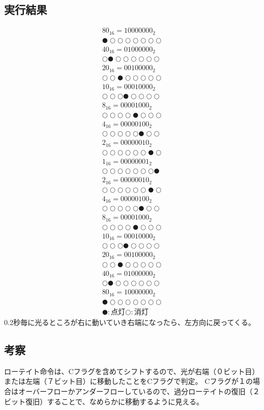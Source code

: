 \documentclass[a4paper,12pt]{ujarticle}
\begin{document}
  \subsection{実行結果}
  \begin{eqnarray*}
   {80}_{16} = 10000000_2 \\
   ●○○○○○○○ \\
   {40}_{16} = 01000000_2 \\
   ○●○○○○○○ \\
   {20}_{16} = 00100000_2 \\
   ○○●○○○○○ \\
   {10}_{16} = 00010000_2 \\
   ○○○●○○○○ \\
   {8}_{16}  = 00001000_2 \\
   ○○○○●○○○ \\
   {4}_{16}  = 00000100_2 \\
   ○○○○○●○○ \\
   {2}_{16}  = 00000010_2 \\
   ○○○○○○●○ \\
   {1}_{16}  = 00000001_2 \\
   ○○○○○○○● \\
   {2}_{16}  = 00000010_2 \\
   ○○○○○○●○ \\
   {4}_{16}  = 00000100_2 \\
   ○○○○○●○○ \\
   {8}_{16}  = 00001000_2 \\
   ○○○○●○○○ \\
   {10}_{16} = 00010000_2 \\
   ○○○●○○○○ \\
   {20}_{16} = 00100000_2 \\
   ○○●○○○○○ \\
   {40}_{16} = 01000000_2 \\
   ○●○○○○○○ \\
   {80}_{16} = 10000000_2 \\
   ●○○○○○○○ \\
   ●:点灯○:消灯
  \end{eqnarray*}
  0.2秒毎に光るところが右に動いていき右端になったら、左方向に戻ってくる。
  \subsection{考察}
  ローテイト命令は、Cフラグを含めてシフトするので、光が右端（０ビット目）または左端（７ビット目）に移動したことをCフラグで判定。
  Cフラグが１の場合はオーバーフローかアンダーフローしているので、過分ローテイトの復旧（２ビット復旧）することで、なめらかに移動するように見える。
\end{document}
